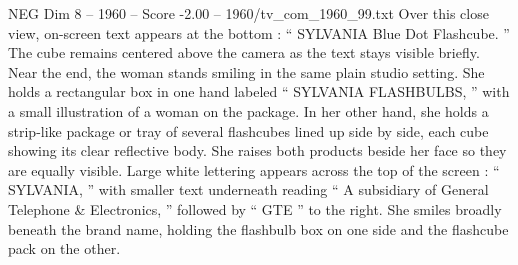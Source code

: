 \begin{textsample}{NEG Dim 8 – 1960 – Score -2.00 – 1960/tv\_com\_1960\_99.txt}
Over this close view, on-screen text appears at the bottom : “ SYLVANIA Blue Dot Flashcube. ” The cube remains centered above the camera as the text stays visible briefly.
Near the end, the woman stands smiling in the same plain studio setting.
She holds a rectangular box in one hand labeled “ SYLVANIA FLASHBULBS, ” with a small illustration of a woman on the package.
In her other hand, she holds a strip-like package or tray of several flashcubes lined up side by side, each cube showing its clear reflective body.
She raises both products beside her face so they are equally visible.
Large white lettering appears across the top of the screen : “ SYLVANIA, ” with smaller text underneath reading “ A subsidiary of General Telephone \& Electronics, ” followed by “ GTE ” to the right.
She smiles broadly beneath the brand name, holding the flashbulb box on one side and the flashcube pack on the other.

\end{textsample}
